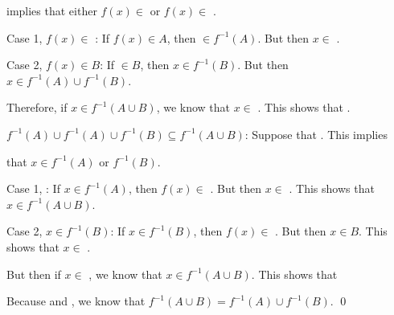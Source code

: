 \documentclass[11pt,letterpaper]{article}
\newcommand{\blank}[1]{\underline{\hspace{#1}}} %
\begin{document}
implies that either $f(x) \in$ \blank{3cm} or $f(x) \in$ \blank{3cm}. \pspace

Case 1, $f(x) \in$ \blank{3cm}: If $f(x) \in A$, then \blank{3cm} $\in f^{-1}(A)$. But then $x \in$ \blank{3cm}. \pspace

Case 2, $f(x) \in B$: If \blank{3cm} $\in B$, then $x \in f^{-1}(B)$. But then $x \in f^{-1}(A) \cup f^{-1}(B)$. \pspace

Therefore, if $x \in f^{-1}(A \cup B)$, we know that $x \in$ \blank{5cm}. This shows that \pspace \blank{5cm}. 

$f^{-1}(A) \cup f^{-1}(A) \cup f^{-1}(B) \subseteq f^{-1}(A \cup B)$: Suppose that \blank{5cm}. This implies \pspace

that $x \in f^{-1}(A)$ or $f^{-1}(B)$. \pspace

Case 1, \blank{3cm}: If $x \in f^{-1}(A)$, then $f(x) \in$ \blank{3cm}. But then $x \in$ \blank{3cm}. \pspace This shows that $x \in f^{-1}(A \cup B)$.





Case 2, $x \in f^{-1}(B)$: If $x \in f^{-1}(B)$, then $f(x) \in$ \blank{3cm}. But then $x \in B$. This shows \pspace that $x \in$ \blank{3cm}. 

But then if $x \in$ \blank{5cm}, we know that $x \in f^{-1}(A \cup B)$. This shows that \pspace \blank{5cm} 

\newpage

Because \blank{5cm} and \blank{5cm}, we know that \pspace $f^{-1}(A \cup B)= f^{-1}(A) \cup f^{-1}(B)$. \qed 
\end{document}
